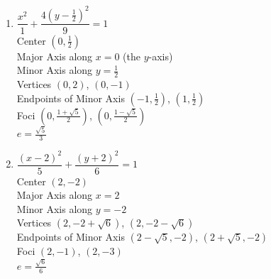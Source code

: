 \begin{multicols}{2}
\begin{enumerate}
\setcounter{enumi}{\value{HW}}

\item  $\dfrac{x^2}{1} + \dfrac{4\left(y-\frac{1}{2}\right)^2}{9} = 1$\\
Center  $\left(0, \frac{1}{2} \right)$\\
Major Axis along $x=0$ (the $y$-axis)\\
Minor Axis along $y=\frac{1}{2}$\\
Vertices  $\left( 0, 2   \right)$, $(0, -1)$\\
Endpoints of Minor Axis $\left(-1, \frac{1}{2} \right)$, $\left(1, \frac{1}{2} \right)$\\
Foci $\left(0, \frac{1+\sqrt{5}}{2}\right)$, $\left(0, \frac{1-\sqrt{5}}{2}\right)$\\
$e = \frac{\sqrt{5}}{3}$

\vfill

\columnbreak


\item  $\dfrac{(x-2)^2}{5} + \dfrac{\left(y+2\right)^2}{6} = 1$\\
Center  $\left(2, -2 \right)$\\
Major Axis along $x=2$\\
Minor Axis along $y=-2$\\
Vertices  $\left( 2, -2+\sqrt{6}   \right)$, $(2, -2-\sqrt{6})$\\
Endpoints of Minor Axis $\left(2-\sqrt{5},-2 \right)$, $\left(2+\sqrt{5},-2\right)$\\
Foci $\left(2,-1 \right)$, $\left(2, -3\right)$\\
$e = \frac{\sqrt{6}}{6}$



\setcounter{HW}{\value{enumi}}
\end{enumerate}
\end{multicols}



